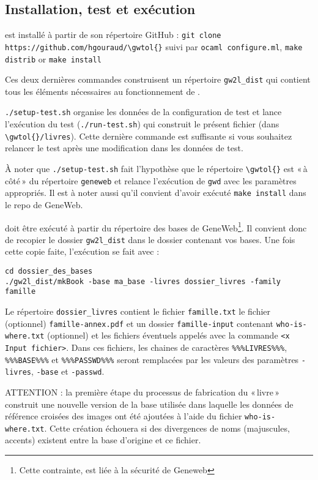 \subsection{Installation, test et exécution}

\gwtol{} est installé à partir de son répertoire GitHub :
\verb|git clone https://github.com/hgouraud/\gwtol{}|
suivi par
\verb|ocaml configure.ml|, \verb|make distrib| or \verb|make install|

Ces deux dernières commandes construisent un répertoire \verb|gw2l_dist| qui
contient tous les éléments nécessaires au fonctionnement de \gwtol{}.

\verb|./setup-test.sh| organise les données de la configuration de test et
lance l'exécution du test (\verb|./run-test.sh|) qui construit le présent
fichier (dans \verb|\gwtol{}/livres|). Cette dernière commande est
suffisante si vous souhaitez relancer le test après une modification
dans les données de test.

À noter que \verb|./setup-test.sh| fait l'hypothèse que le répertoire
\verb|\gwtol{}| est «\,à côté\,» du répertoire \verb|geneweb| et relance
l'exécution de \verb|gwd| avec les paramètres appropriés. Il est à noter
aussi qu'il convient d'avoir exécuté \verb|make install| dans le repo de GeneWeb.

\gwtol{} doit être exécuté à partir du répertoire des bases de
GeneWeb\footnote{Cette contrainte, est liée à la sécurité de Geneweb}.
Il convient donc de recopier le dossier \verb|gw2l_dist| dans le
dossier contenant vos bases. Une fois cette copie faite, l'exécution se
fait avec :
\begin{verbatim}
cd dossier_des_bases
./gw2l_dist/mkBook -base ma_base -livres dossier_livres -family famille
\end{verbatim}

Le répertoire \verb|dossier_livres| contient le fichier \verb|famille.txt|
le fichier (optionnel) \verb|famille-annex.pdf| et un dossier
\verb|famille-input| contenant \verb|who-is-where.txt| (optionnel)
et les fichiers éventuels appelés avec la commande \verb|<x Input fichier>|.
Dans ces fichiers, les chaines de caractères \verb|%%%LIVRES%%%|,
\verb|%%%BASE%%%| et \verb|%%%PASSWD%%%| seront remplacées par les valeurs
des paramètres \verb|-livres|, \verb|-base| et \verb|-passwd|.

ATTENTION : la première étape du processus de fabrication du «\,livre\,»
construit une nouvelle version de la base utilisée dans laquelle les
données de référence croisées des images ont été ajoutées à l'aide du
fichier \verb|who-is-where.txt|.
Cette création échouera si des divergences de noms (majuscules, accents)
existent entre la base d'origine et ce fichier.

